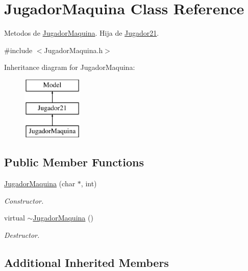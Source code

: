 \hypertarget{class_jugador_maquina}{}\section{Jugador\+Maquina Class Reference}
\label{class_jugador_maquina}


Metodos de \hyperlink{class_jugador_maquina}{Jugador\+Maquina}. Hija de \hyperlink{class_jugador21}{Jugador21}.  




{\ttfamily \#include $<$Jugador\+Maquina.\+h$>$}

Inheritance diagram for Jugador\+Maquina\+:\begin{figure}[H]
\begin{center}
\leavevmode
\includegraphics[height=3.000000cm]{class_jugador_maquina}
\end{center}
\end{figure}
\subsection*{Public Member Functions}
\begin{DoxyCompactItemize}
\item 
\hyperlink{class_jugador_maquina_ac67d579c7aa41ca6ecdfd424f5d8001d}{Jugador\+Maquina} (char $\ast$, int)
\begin{DoxyCompactList}\small\item\em Constructor. \end{DoxyCompactList}\item 
virtual \hyperlink{class_jugador_maquina_a0d360dbd742297fd73ffcdc0d028abe5}{$\sim$\+Jugador\+Maquina} ()\hypertarget{class_jugador_maquina_a0d360dbd742297fd73ffcdc0d028abe5}{}\label{class_jugador_maquina_a0d360dbd742297fd73ffcdc0d028abe5}

\begin{DoxyCompactList}\small\item\em Destructor. \end{DoxyCompactList}\end{DoxyCompactItemize}
\subsection*{Additional Inherited Members}


